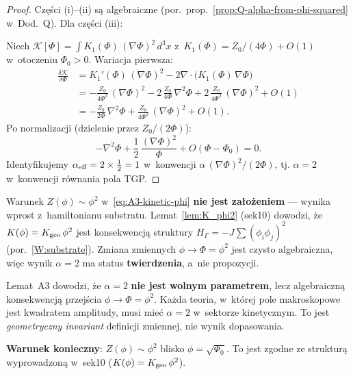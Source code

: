 \begin{proof}
Cz\k{e}\'sci (i)--(ii) s\k{a} algebraiczne (por.~prop.~\ref{prop:Q-alpha-from-phi-squared}
w~Dod.~Q). Dla cz\k{e}\'sci (iii):

Niech $\mathcal{K}[\Phi] = \int K_1(\Phi)\,(\nabla\Phi)^2\,d^3x$
z~$K_1(\Phi) = Z_0/(4\Phi) + O(1)$ w~otoczeniu $\Phi_0 > 0$.
Wariacja pierwsza:
\begin{align}
  \frac{\delta\mathcal{K}}{\delta\Phi}
  &= K_1'(\Phi)\,(\nabla\Phi)^2 - 2\nabla\cdot\bigl(K_1(\Phi)\,\nabla\Phi\bigr)
  \nonumber\\
  &= -\frac{Z_0}{4\Phi^2}\,(\nabla\Phi)^2
    - 2\,\frac{Z_0}{4\Phi}\,\nabla^2\Phi
    + 2\,\frac{Z_0}{4\Phi^2}\,(\nabla\Phi)^2
    + O(1)
  \nonumber\\
  &= -\frac{Z_0}{2\Phi}\,\nabla^2\Phi
    + \frac{Z_0}{4\Phi^2}\,(\nabla\Phi)^2
    + O(1).
  \label{eq:A3-variation}
\end{align}
Po normalizacji (dzielenie przez $Z_0/(2\Phi)$):
\[
  -\nabla^2\Phi + \frac{1}{2}\,\frac{(\nabla\Phi)^2}{\Phi}
  + O(\Phi - \Phi_0) = 0.
\]
Identyfikujemy $\alpha_{\rm eff} = 2 \times \tfrac{1}{2} = 1$
w~konwencji $\alpha\,(\nabla\Phi)^2/(2\Phi)$, tj.
\textbf{$\alpha = 2$} w~konwencji r\'ownania pola TGP.
\end{proof}

\begin{uwaga}
\label{rem:A3-sek10}
Warunek $Z(\phi) \sim \phi^2$ w~\eqref{eq:A3-kinetic-phi} \textbf{nie jest za\l{}o\.zeniem}
--- wynika wprost z~hamiltonianu substratu.
Lemat~\ref{lem:K_phi2} (sek10) dowodzi, \.ze
$K(\phi) = K_{\rm geo}\,\phi^2$ jest konsekwencj\k{a}
struktury $H_\Gamma = -J\sum(\phi_i\phi_j)^2$
(por.~\ref{W:substrate}).
Zmiana zmiennych $\phi \to \Phi = \phi^2$ jest czysto algebraiczna,
wi\k{e}c wynik $\alpha = 2$ ma status \textbf{twierdzenia},
a~nie propozycji.
\end{uwaga}

\begin{uwaga}[Strukturalno\'s\'c $\alpha = 2$]
\label{rem:A3-structural}
Lemat~A3 dowodzi, \.ze $\alpha = 2$ \textbf{nie jest wolnym parametrem},
lecz algebraiczn\k{a} konsekwencj\k{a} przejścia $\phi \to \Phi = \phi^2$.
Ka\.zda teoria, w~kt\'orej pole makroskopowe jest kwadratem amplitudy,
musi mie\'c $\alpha = 2$ w~sektorze kinetycznym. To jest \emph{geometryczny
invariant} definicji zmiennej, nie wynik dopasowania.

\medskip\noindent
\textbf{Warunek konieczny}: $Z(\phi) \sim \phi^2$ blisko $\phi = \sqrt{\Phi_0}$.
To jest zgodne ze struktur\k{a} wyprowadzon\k{a} w~sek10
($K(\phi) = K_{\rm geo}\,\phi^2$).
\end{uwaga}

